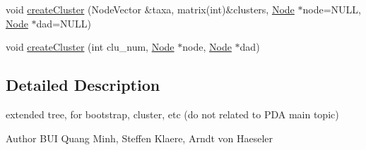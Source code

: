 \begin{DoxyCompactItemize}
\item 
void \hyperlink{classMExtTree_a39d9c5216f1c8cad04b50972a2c83897}{createCluster} (NodeVector \&taxa, matrix(int)\&clusters, \hyperlink{classNode}{Node} $\ast$node=NULL, \hyperlink{classNode}{Node} $\ast$dad=NULL)
\item 
void \hyperlink{classMExtTree_a658a3e1db727b23b7ce67754347230f5}{createCluster} (int clu\_\-num, \hyperlink{classNode}{Node} $\ast$node, \hyperlink{classNode}{Node} $\ast$dad)
\end{DoxyCompactItemize}


\subsection{Detailed Description}
extended tree, for bootstrap, cluster, etc (do not related to PDA main topic)

\begin{DoxyAuthor}{Author}
BUI Quang Minh, Steffen Klaere, Arndt von Haeseler 
\end{DoxyAuthor}


